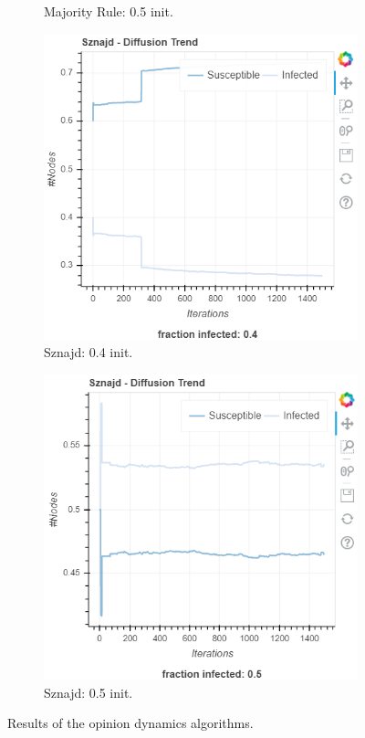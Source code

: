 \documentclass[sigchi]{acmart}
\begin{document}
\begin{figure}[ht]
\begin{subfigure}{.20\textwidth}
  \caption{Majority Rule: 0.5 init.}
  \label{fig:sub-sixth}
\end{subfigure}
\hfill
\begin{subfigure}{.20\textwidth}
  \centering
  \includegraphics[width=\linewidth]{report/img/sznajd1.png} 
  \caption{Sznajd: 0.4 init.}
  \label{fig:sub-seventh}
\end{subfigure}
\hfill
\begin{subfigure}{.20\textwidth}
  \centering
  \includegraphics[width=\linewidth]{report/img/sznajd2.png}
  \caption{Sznajd: 0.5 init.}
  \label{fig:sub-eighth}
\end{subfigure}
\caption{Results of the opinion dynamics algorithms.}
\label{fig:ODresults}
\end{figure}
\end{document}
